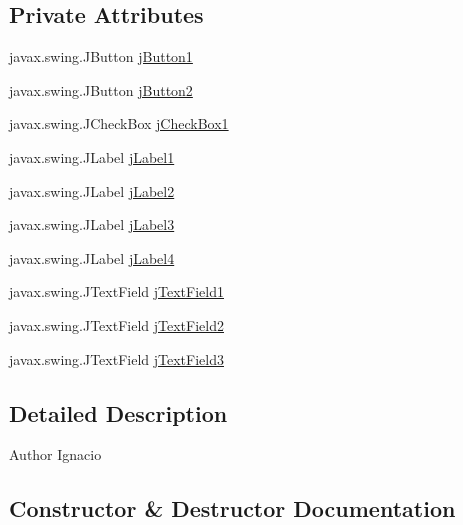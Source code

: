 \subsection*{Private Attributes}
\begin{DoxyCompactItemize}
\item 
javax.\+swing.\+J\+Button \mbox{\hyperlink{classsoftware_1_1_ingresar_preso_a6c00105c7f9dbaf091e58501f2f32fb9}{j\+Button1}}
\item 
javax.\+swing.\+J\+Button \mbox{\hyperlink{classsoftware_1_1_ingresar_preso_a33ce6c95d87a5c987b9efde232b63e10}{j\+Button2}}
\item 
javax.\+swing.\+J\+Check\+Box \mbox{\hyperlink{classsoftware_1_1_ingresar_preso_af5dd1d64cebd5001a66aa292c76e6238}{j\+Check\+Box1}}
\item 
javax.\+swing.\+J\+Label \mbox{\hyperlink{classsoftware_1_1_ingresar_preso_a2636febe75f015393218663a91a34e0d}{j\+Label1}}
\item 
javax.\+swing.\+J\+Label \mbox{\hyperlink{classsoftware_1_1_ingresar_preso_abdc8c3f8f7c224e30ff7c4b6c96d5f3f}{j\+Label2}}
\item 
javax.\+swing.\+J\+Label \mbox{\hyperlink{classsoftware_1_1_ingresar_preso_a83ed6c4480193eb6924a625e224524fd}{j\+Label3}}
\item 
javax.\+swing.\+J\+Label \mbox{\hyperlink{classsoftware_1_1_ingresar_preso_a5fb6376942dfd9a5ed07eb887918bea7}{j\+Label4}}
\item 
javax.\+swing.\+J\+Text\+Field \mbox{\hyperlink{classsoftware_1_1_ingresar_preso_ad9f61bb0c1750694824c000a899845cf}{j\+Text\+Field1}}
\item 
javax.\+swing.\+J\+Text\+Field \mbox{\hyperlink{classsoftware_1_1_ingresar_preso_a5f83b859ca7fb0ef832730e50082c083}{j\+Text\+Field2}}
\item 
javax.\+swing.\+J\+Text\+Field \mbox{\hyperlink{classsoftware_1_1_ingresar_preso_a6e52c44f802c280a2154de10ed8679fb}{j\+Text\+Field3}}
\end{DoxyCompactItemize}


\subsection{Detailed Description}
\begin{DoxyAuthor}{Author}
Ignacio 
\end{DoxyAuthor}


\subsection{Constructor \& Destructor Documentation}
\mbox{\label{classsoftware_1_1_ingresar_preso_a565b73716f68bd3fa7126be93b8cb60b}} 
